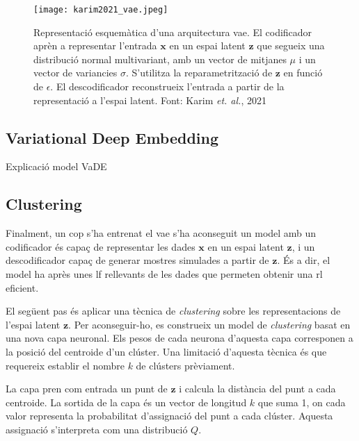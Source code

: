 \documentclass[CAT,BIB]{TFUOC}%
\newcommand{\todo}[1]{
            \begin{tcolorbox}[title=ToDo!, colback=red!5!white, colframe=red!50!black, coltext=red!50!black]
            #1
            \end{tcolorbox}}
\begin{document}
        \begin{figure}
            \centering
            \texttt{[image: karim2021\_vae.jpeg]}
            \caption[\textit{Variational autoencoder}: arquitectura]{
                Representació esquemàtica d'una arquitectura \gls{vae}.
                El codificador aprèn a representar l'entrada $\mathbf{x}$
                en un espai latent $\mathbf{z}$
                que segueix una distribució normal multivariant,
                amb un vector de mitjanes $\mu$ i un vector de variancies $\sigma$.
                S'utilitza la reparametrització de $\mathbf{z}$ en funció de $\epsilon$.
                El descodificador reconstrueix l'entrada
                a partir de la representació a l'espai latent.
                Font: Karim \textit{et. al.}, 2021 \citep{Karim2021}
            }
            \label{fig:vae_min}
        \end{figure}

    \subsection{Variational Deep Embedding}
    \label{s:metodes_vade}

\todo{Explicació model VaDE}


    \subsection{Clustering}
    \label{s:clustering}

        Finalment, un cop s'ha entrenat el \gls{vae}
        s'ha aconseguit un model amb un codificador
        és capaç de representar les dades $\mathbf{x}$ en un espai latent $\mathbf{z}$,
        i un descodificador capaç de generar mostres simulades
        a partir de $\mathbf{z}$.
        És a dir, el model ha après unes \gls{lf} rellevants de les dades
        que permeten obtenir una \gls{rl} eficient.

        El següent pas és aplicar una tècnica de \textit{clustering}
        sobre les representacions de l'espai latent $\mathbf{z}$.
        Per aconseguir-ho,
        es construeix un model de \textit{clustering}
        basat en una nova capa neuronal.
        Els pesos de cada neurona d'aquesta capa
        corresponen a la posició del centroide d'un clúster.
        Una limitació d'aquesta tècnica és que requereix
        establir el nombre $k$ de clústers prèviament.

        La capa pren com entrada un punt de $\mathbf{z}$
        i calcula la distància del punt a cada centroide.
        La sortida de la capa és un vector de longitud $k$ que suma 1,
        on cada valor representa la probabilitat d'assignació del punt a cada clúster.
        Aquesta assignació s'interpreta com una distribució $Q$.
\end{document}
